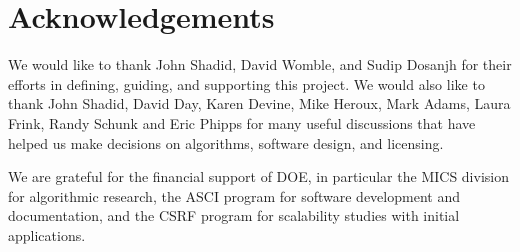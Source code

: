 \chapter*{Acknowledgements}

We would like to thank John Shadid, David Womble, and Sudip Dosanjh for their efforts in defining, guiding, and supporting this project. We would also like to thank John Shadid, David Day, Karen Devine, Mike Heroux, Mark Adams, Laura Frink, Randy Schunk and Eric Phipps for many useful discussions that have helped us make decisions on algorithms, software design, and licensing.

We are grateful for the financial support of DOE, in particular the MICS division for algorithmic research, the ASCI program for software development and documentation, and the CSRF program for scalability studies with initial applications. 